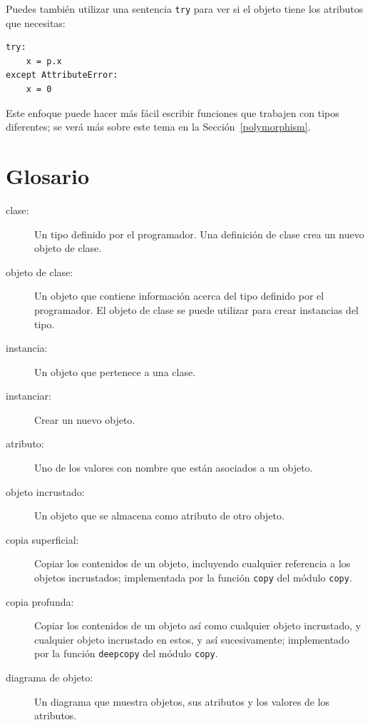 \documentclass[10pt]{book}
\begin{document}
Puedes también utilizar una sentencia {\tt try} para ver si el objeto tiene los
atributos que necesitas:

\begin{verbatim}
try:
    x = p.x
except AttributeError:
    x = 0
\end{verbatim}

Este enfoque puede hacer más fácil escribir funciones que trabajen con
tipos diferentes; se verá más sobre este tema
en la Sección~\ref{polymorphism}.


\section{Glosario}

\begin{description}

\item[clase:] Un tipo definido por el programador.  Una definición de clase crea un nuevo
objeto de clase.

\item[objeto de clase:] Un objeto que contiene información acerca del
tipo definido por el programador.  El objeto de clase se puede utilizar para crear instancias
del tipo.

\item[instancia:] Un objeto que pertenece a una clase.

\item[instanciar:] Crear un nuevo objeto.

\item[atributo:] Uno de los valores con nombre que están asociados a un objeto.

\item[objeto incrustado:] Un objeto que se almacena como atributo
de otro objeto.

\item[copia superficial:] Copiar los contenidos de un objeto, incluyendo
cualquier referencia a los objetos incrustados;
implementada por la función {\tt copy} del módulo {\tt copy}.

\item[copia profunda:] Copiar los contenidos de un objeto así como cualquier
objeto incrustado, y cualquier objeto incrustado en estos, y así sucesivamente;
implementado por la función {\tt deepcopy} del módulo {\tt copy}.

\item[diagrama de objeto:] Un diagrama que muestra objetos, sus
atributos y los valores de los atributos.

\end{description}
\end{document}
